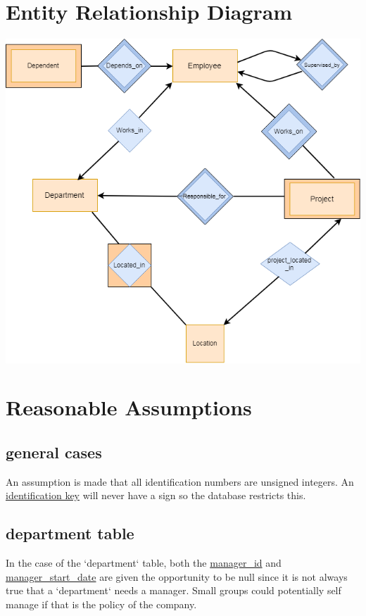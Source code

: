 \documentclass[11pt,letterpaper]{article}
\begin{document}
	\section{Entity Relationship Diagram}
\hspace*{-1.1cm}\includegraphics[width=\graphicwidth]{erd.png}
	\section{Reasonable Assumptions}
		\subsection{general cases}
	An assumption is made that all identification numbers are unsigned integers. An \uline{identification key} will never have a sign so the database restricts this. \\	
	
	\subsection{department table}
	In the case of the `department` table, both the \uline{manager\_id} and \uline{manager\_start\_date} are given the opportunity to be null since it is not always true that a `department` needs a manager. Small groups could potentially self manage if that is the policy of the company. \\
\end{document}
